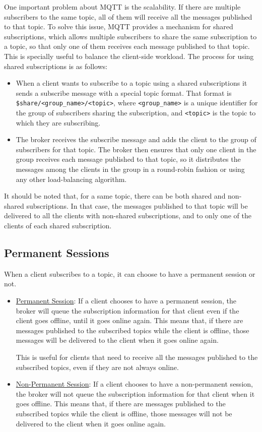 One important problem about MQTT is the scalability. If there are multiple subscribers to the same topic, all of them will receive all the messages published to that topic. To solve this issue, MQTT provides a mechanism for shared subscriptions, which allows multiple subscribers to share the same subscription to a topic, so that only one of them receives each message published to that topic. This is specially useful to balance the client-side workload.
The process for using shared subscriptions is as follows:
\begin{itemize}
    \item When a client wants to subscribe to a topic using a shared subscriptions it sends a subscribe message with a special topic format. That format is \texttt{\$share/<group\_name>/<topic>}, where \texttt{<group\_name>} is a unique identifier for the group of subscribers sharing the subscription, and \texttt{<topic>} is the topic to which they are subscribing.
    \item The broker receives the subscribe message and adds the client to the group of subscribers for that topic. The broker then ensures that only one client in the group receives each message published to that topic, so it distributes the messages among the clients in the group in a round-robin fashion or using any other load-balancing algorithm.
\end{itemize}

It should be noted that, for a same topic, there can be both shared and non-shared subscriptions. In that case, the messages published to that topic will be delivered to all the clients with non-shared subscriptions, and to only one of the clients of each shared subscription.

\subsection{Permanent Sessions}

When a client subscribes to a topic, it can choose to have a permanent session or not.
\begin{itemize}
    \item \ul{Permanent Session}: If a client chooses to have a permanent session, the broker will queue the subscription information for that client even if the client goes offline, until it goes online again. This means that, if there are messages published to the subscribed topics while the client is offline, those messages will be delivered to the client when it goes online again.
    
    This is useful for clients that need to receive all the messages published to the subscribed topics, even if they are not always online.
    \item \ul{Non-Permanent Session}: If a client chooses to have a non-permanent session, the broker will not queue the subscription information for that client when it goes offline. This means that, if there are messages published to the subscribed topics while the client is offline, those messages will not be delivered to the client when it goes online again.
\end{itemize}

